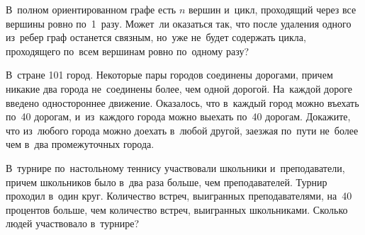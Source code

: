 \begin{problems}
\item
В~полном ориентированном графе есть $n$ вершин и~цикл, проходящий через все
вершины ровно по~1~разу.
Может~ли оказаться так, что после удаления одного из~ребер граф останется
связным, но~уже не~будет содержать цикла, проходящего по~всем вершинам ровно
по~одному разу?

\item
В~стране 101 город.
Некоторые пары городов соединены дорогами, причем никакие два города
не~соединены более, чем одной дорогой.
На~каждой дороге введено одностороннее движение.
Оказалось, что в~каждый город можно въехать по~40 дорогам, и~из~каждого города
можно выехать по~40 дорогам.
Докажите, что из~любого города можно доехать в~любой другой, заезжая по~пути
не~более чем в~два промежуточных города.

\item
В~турнире по~настольному теннису участвовали школьники и~преподаватели, причем
школьников было в~два раза больше, чем преподавателей.
Турнир проходил в~один круг.
Количество встреч, выигранных преподавателями, на~40 процентов больше, чем
количество встреч, выигранных школьниками.
Сколько людей участвовало в~турнире?

\end{problems}

